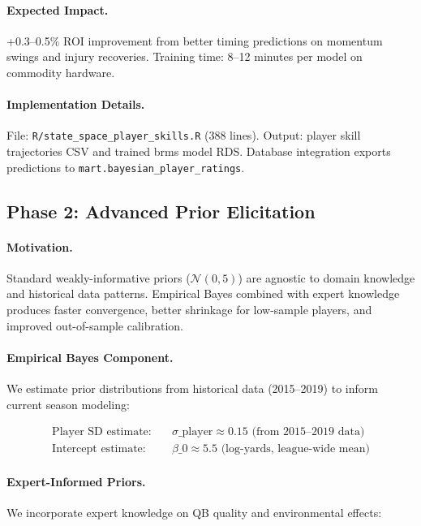\paragraph{Expected Impact.}
+0.3--0.5\% ROI improvement from better timing predictions on momentum swings and injury recoveries. Training time: 8--12 minutes per model on commodity hardware.

\paragraph{Implementation Details.}
File: \texttt{R/state\_space\_player\_skills.R} (388 lines). Output: player skill trajectories CSV and trained brms model RDS. Database integration exports predictions to \texttt{mart.bayesian\_player\_ratings}.

\subsection{Phase 2: Advanced Prior Elicitation}

\paragraph{Motivation.}
Standard weakly-informative priors ($\mathcal{N}(0, 5)$) are agnostic to domain knowledge and historical data patterns. Empirical Bayes combined with expert knowledge produces faster convergence, better shrinkage for low-sample players, and improved out-of-sample calibration.

\paragraph{Empirical Bayes Component.}
We estimate prior distributions from historical data (2015--2019) to inform current season modeling:

\begin{align}
\text{Player SD estimate:} &\quad \sigma\_{\text{player}} \approx 0.15 \text{ (from 2015--2019 data)} \\
\text{Intercept estimate:} &\quad \beta\_0 \approx 5.5 \text{ (log-yards, league-wide mean)}
\end{align}

\paragraph{Expert-Informed Priors.}
We incorporate expert knowledge on QB quality and environmental effects:

